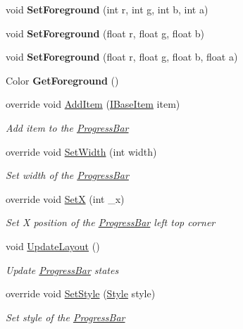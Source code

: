 \begin{DoxyCompactItemize}
void {\bfseries Set\+Foreground} (int r, int g, int b, int a)
\item 
\mbox{\label{class_space_v_i_l_1_1_progress_bar_a49647fe88d72992e69ab50c86e64a160}} 
void {\bfseries Set\+Foreground} (float r, float g, float b)
\item 
\mbox{\label{class_space_v_i_l_1_1_progress_bar_a4fb9b7112f997d712647f3269200fc50}} 
void {\bfseries Set\+Foreground} (float r, float g, float b, float a)
\item 
\mbox{\label{class_space_v_i_l_1_1_progress_bar_ae484479a3f7a47c8b698095cdb684949}} 
Color {\bfseries Get\+Foreground} ()
\item 
override void \mbox{\hyperlink{class_space_v_i_l_1_1_progress_bar_a5948fb4d1ee63baefb2624c03262a01c}{Add\+Item}} (\mbox{\hyperlink{interface_space_v_i_l_1_1_core_1_1_i_base_item}{I\+Base\+Item}} item)
\begin{DoxyCompactList}\small\item\em Add item to the \mbox{\hyperlink{class_space_v_i_l_1_1_progress_bar}{Progress\+Bar}} \end{DoxyCompactList}\item 
override void \mbox{\hyperlink{class_space_v_i_l_1_1_progress_bar_af970d2e5eed12540914beb9978e25665}{Set\+Width}} (int width)
\begin{DoxyCompactList}\small\item\em Set width of the \mbox{\hyperlink{class_space_v_i_l_1_1_progress_bar}{Progress\+Bar}} \end{DoxyCompactList}\item 
override void \mbox{\hyperlink{class_space_v_i_l_1_1_progress_bar_a5ceeeefd0b4fb56ba6226d294e784a3e}{SetX}} (int \+\_\+x)
\begin{DoxyCompactList}\small\item\em Set X position of the \mbox{\hyperlink{class_space_v_i_l_1_1_progress_bar}{Progress\+Bar}} left top corner \end{DoxyCompactList}\item 
void \mbox{\hyperlink{class_space_v_i_l_1_1_progress_bar_a210b9b1fb096d851fcbc1aa34872f389}{Update\+Layout}} ()
\begin{DoxyCompactList}\small\item\em Update \mbox{\hyperlink{class_space_v_i_l_1_1_progress_bar}{Progress\+Bar}} states \end{DoxyCompactList}\item 
override void \mbox{\hyperlink{class_space_v_i_l_1_1_progress_bar_a7dc05324af7a604cef781aab687b17cc}{Set\+Style}} (\mbox{\hyperlink{class_space_v_i_l_1_1_decorations_1_1_style}{Style}} style)
\begin{DoxyCompactList}\small\item\em Set style of the \mbox{\hyperlink{class_space_v_i_l_1_1_progress_bar}{Progress\+Bar}} \end{DoxyCompactList}\end{DoxyCompactItemize}
